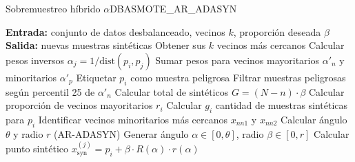 \begin{algorithm}[H]
\caption{Sobremuestreo híbrido \boldmath$\alpha$DBASMOTE\_AR\_ADASYN}
\begin{algorithmic}[1]
\State \textbf{Entrada:} conjunto de datos desbalanceado, vecinos $k$, proporción deseada $\beta$
\State \textbf{Salida:} nuevas muestras sintéticas
  \State Obtener sus $k$ vecinos más cercanos
  \State Calcular pesos inversos $\alpha_j = 1/\text{dist}(p_i, p_j)$
  \State Sumar pesos para vecinos mayoritarios $\alpha'_n$ y minoritarios $\alpha'_p$
    \State Etiquetar $p_i$ como muestra peligrosa
  \EndIf
\EndFor
\State Filtrar muestras peligrosas según percentil 25 de $\alpha'_n$
\State Calcular total de sintéticos $G = (N - n) \cdot \beta$
  \State Calcular proporción de vecinos mayoritarios $r_i$
  \State Calcular $g_i$ cantidad de muestras sintéticas para $p_i$
  \State Identificar vecinos minoritarios más cercanos $x_{nn1}$ y $x_{nn2}$
  \State Calcular ángulo $\theta$ y radio $r$ (AR-ADASYN)
    \State Generar ángulo $\alpha \in [0, \theta]$, radio $\beta \in [0, r]$
    \State Calcular punto sintético $x^{(j)}_{\text{syn}} = p_i + \beta \cdot R(\alpha) \cdot r(\alpha)$
  \EndFor
\EndFor
\end{algorithmic}
\end{algorithm}
